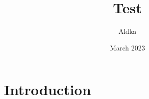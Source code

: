 \documentclass{article}
\title{Test}
\author{Aldka }
\date{March 2023}
\begin{document}
\maketitle

\section{Introduction}
\end{document}
